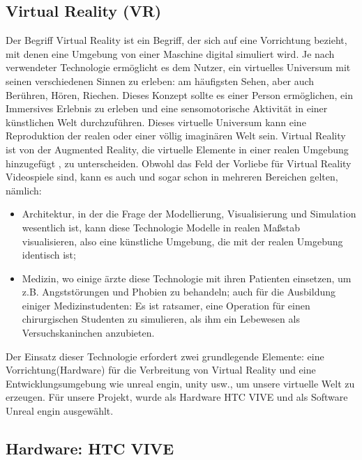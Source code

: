 \subsection{Virtual Reality (VR)} \label{grund-vr}


Der Begriff Virtual Reality ist ein Begriff, der sich auf eine Vorrichtung bezieht, mit denen eine Umgebung von einer Maschine digital simuliert wird. 
Je nach verwendeter Technologie erm{\"o}glicht es dem Nutzer, ein virtuelles Universum mit seinen verschiedenen Sinnen zu erleben: 
am h{\"a}ufigsten Sehen, aber auch Ber{\"u}hren, H{\"o}ren, Riechen. 
Dieses Konzept sollte es einer Person erm{\"o}glichen, ein Immersives Erlebnis zu erleben und eine sensomotorische Aktivit{\"a}t in einer k{\"u}nstlichen Welt durchzuf{\"u}hren. 
Dieses virtuelle Universum kann eine Reproduktion der realen oder einer v{\"o}llig imagin{\"a}ren Welt sein. 
Virtual Reality ist von der Augmented Reality, die virtuelle Elemente in einer realen Umgebung hinzugef{\"u}gt , zu unterscheiden.
Obwohl das Feld der Vorliebe f{\"u}r Virtual Reality Videospiele sind, kann es auch und sogar schon in mehreren Bereichen gelten, n{\"a}mlich\cite{kolb18}:


\begin{itemize} \setlength\itemsep{-0.15cm}
  \item Architektur, in der die Frage der Modellierung, Visualisierung und Simulation wesentlich ist, kann diese Technologie Modelle in realen Ma{\ss}stab visualisieren, also eine k{\"u}nstliche Umgebung, die mit der realen Umgebung identisch ist;
  \item Medizin, wo einige {\"a}rzte diese Technologie mit ihren Patienten einsetzen, um z.B. Angstst{\"o}rungen und Phobien zu behandeln; auch f{\"u}r die Ausbildung einiger Medizinstudenten: Es ist ratsamer, eine Operation f{\"u}r einen chirurgischen Studenten zu simulieren, als ihm ein Lebewesen als Versuchskaninchen anzubieten.
\end{itemize}


Der Einsatz dieser Technologie erfordert zwei grundlegende Elemente: 
eine Vorrichtung(Hardware) f{\"u}r die Verbreitung von Virtual Reality und eine Entwicklungsumgebung wie unreal engin, unity usw., um unsere virtuelle Welt zu erzeugen. 
F{\"u}r unsere Projekt, wurde als Hardware HTC VIVE und als Software Unreal engin ausgew{\"a}hlt.




\subsection{Hardware: HTC VIVE} \label{vr-hardware}

